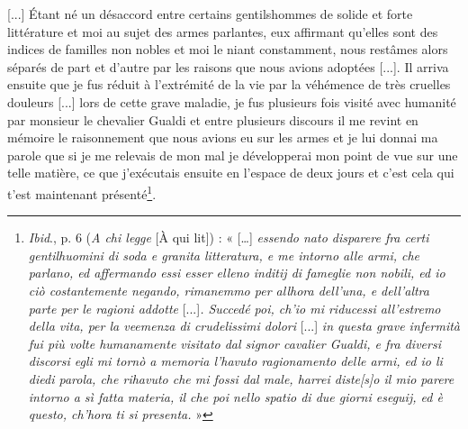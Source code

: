 \documentclass[12pt,twoside,openany]{book}
\renewenvironment{quote}
  {%
    \par\begingroup
    \fontsize{11pt}{14pt}\selectfont
    \list{}{\leftmargin=1.5em\rightmargin=1.5em}%
    \item\relax
  }
  {%
    \endlist
    \endgroup
  }
\newenvironment{PurhBlockQuote}
  {%
    \begin{quote}
  }
  {%
    \end{quote}
  }
\begin{document}
\begin{PurhBlockQuote}
[...] Étant né un désaccord entre certains gentilshommes de solide et forte littérature et moi au sujet des armes parlantes, eux affirmant qu’elles sont des indices de familles non nobles et moi le niant constamment, nous restâmes alors séparés de part et d’autre par les raisons que nous avions adoptées [...]. Il arriva ensuite que je fus réduit à l’extrémité de la vie par la véhémence de très cruelles douleurs [...] lors de cette grave maladie, je fus plusieurs fois visité avec humanité par monsieur le chevalier Gualdi et entre plusieurs discours il me revint en mémoire le raisonnement que nous avions eu sur les armes et je lui donnai ma parole que si je me relevais de mon mal je développerai mon point de vue sur une telle matière, ce que j’exécutais ensuite en l’espace de deux jours et c’est cela qui t’est maintenant présenté\footnote{\textit{Ibid}., p. 6 (\textit{A chi legge }[À qui lit]) : « […] \textit{essendo nato disparere fra certi gentilhuomini di soda e granita litteratura, e me intorno alle armi, che parlano, ed affermando essi esser elleno inditij di fameglie non nobili, ed io ciò costantemente negando, rimanemmo per allhora dell’una, e dell’altra parte per le ragioni addotte }[...]\textit{. Succedé poi, ch’io mi riducessi all’estremo della vita, per la veemenza di crudelissimi dolori }[...]\textit{ in questa grave infermità fui più volte humanamente visitato dal signor cavalier Gualdi, e fra diversi discorsi egli mi tornò a memoria l’havuto ragionamento delle armi, ed io li diedi parola, che rihavuto che mi fossi dal male, harrei diste[s]o il mio parere intorno a sì fatta materia, il che poi nello spatio di due giorni eseguij, ed è questo, ch’hora ti si presenta. }»}.
\end{PurhBlockQuote}
\end{document}
